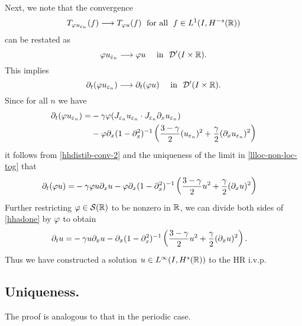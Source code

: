%
Next, we note that the convergence  
%
\begin{equation}
\label{hhweak-conv-2}
T_{\varphi u_{\varepsilon_n}}(f)  \longrightarrow  T_{\varphi u} (f) \;
\ \text{for all} \  \;  f \in L^1(I, H^{-s}(\mathbb{R}))
\end{equation}
%
can be restated as 
%
\begin{equation}
\varphi u_{\varepsilon_n}  \longrightarrow  \varphi u
\quad
\ \text{in} \  \,\,
\mathcal{D}'(I\times \mathbb{R}).
\end{equation}
%
This implies 
%
\begin{equation}
\label{hhdistib-conv-2}
\partial_t(\varphi u_{\varepsilon_n})  \longrightarrow  \partial_t (\varphi u)
\quad
\ \text{in} \   \,\, \mathcal{D}'(I\times \mathbb{R}).
\end{equation}
%
Since for all $n$ we have 
%
\begin{equation}
\begin{split}
\partial_t (\varphi u_{\varepsilon_n})
= & -\gamma \varphi
(J_{\varepsilon_n} u_{\varepsilon_n}  \cdot
J_{\varepsilon_n}\partial_x u_{\varepsilon_n})
\\
& -
\varphi \partial_x(1- \partial_x^2)^{-1} \left( \frac{3-\gamma}{2} (u_{\varepsilon_n})^2
+ \frac{\gamma}{2} (\partial_x u_{\varepsilon_n})^2 \right )
\end{split}
\end{equation}
%
it follows from \eqref{hhdistib-conv-2} and the uniqueness of the
limit in \eqref{llloc-non-loc-tog} that
\begin{equation}
\begin{split}
\partial_t (\varphi u)
= & -\gamma \varphi
u \partial_x u - \varphi \partial_x(1- \partial_x^2)^{-1} \left( \frac{3-\gamma}{2} u^2
+ \frac{\gamma}{2} (\partial_x u)^2 \right )
\label{hhadone}
\end{split}
\end{equation}
Further restricting $\varphi \in \mathcal{S}(\mathbb{R})$ to be nonzero in
$\mathbb{R}$, we
can divide both sides of \eqref{hhadone} by $\varphi$ to obtain
\begin{equation}
\label{hh2yy}
\begin{split}
\partial_t  u
= & -\gamma
u \partial_x u - \partial_x(1- \partial_x^2)^{-1} \left( \frac{3-\gamma}{2} u^2
+ \frac{\gamma}{2} (\partial_x u)^2 \right ).
\end{split}
\end{equation}
Thus we have constructed a solution $u \in L^\infty(I, H^s(\mathbb{R}))$
to the HR i.v.p. 
\subsection{Uniqueness.} The proof is analogous to that in the periodic case.
